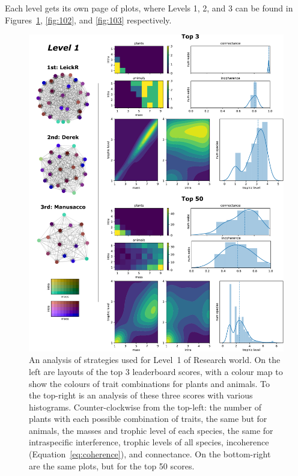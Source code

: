 Each level gets its own page of plots, where Levels 1, 2, and 3 can be found in Figures~\ref{fig:101}, \ref{fig:102}, and \ref{fig:103} respectively.
\begin{figure}
  \centering
  \includegraphics[height=.85\textheight, right]{joy/101.pdf}
  \caption[Results from Research World Level~1]{An analysis of strategies used for Level~1 of Research world. On the left are layouts of the top 3 leaderboard scores, with a colour map to show the colours of trait combinations for plants and animals.
  To the top-right is an analysis of these three scores with various histograms. Counter-clockwise from the top-left: the number of plants with each possible combination of traits, the same but for animals, the masses and trophic level of each species, the same for intraspecific interference, trophic levels of all species, incoherence (Equation~\eqref{eq:coherence}), and connectance. On the bottom-right are the same plots, but for the top 50 scores.}
  \label{fig:101}
\end{figure}
